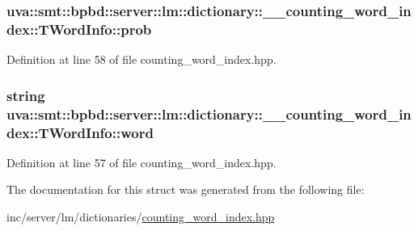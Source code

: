\subsubsection[{prob}]{ uva\+::smt\+::bpbd\+::server\+::lm\+::dictionary\+::\+\_\+\+\_\+counting\+\_\+word\+\_\+index\+::\+T\+Word\+Info\+::prob}\label{structuva_1_1smt_1_1bpbd_1_1server_1_1lm_1_1dictionary_1_1____counting__word__index_1_1_t_word_info_ad39acbec02b2bde9c70dd413eefced65}


Definition at line 58 of file counting\+\_\+word\+\_\+index.\+hpp.

\hypertarget{structuva_1_1smt_1_1bpbd_1_1server_1_1lm_1_1dictionary_1_1____counting__word__index_1_1_t_word_info_ade7f9a66782c83f4837c18021c621d38}{}
\subsubsection[{word}]{\setlength{\rightskip}{0pt plus 5cm}string uva\+::smt\+::bpbd\+::server\+::lm\+::dictionary\+::\+\_\+\+\_\+counting\+\_\+word\+\_\+index\+::\+T\+Word\+Info\+::word}\label{structuva_1_1smt_1_1bpbd_1_1server_1_1lm_1_1dictionary_1_1____counting__word__index_1_1_t_word_info_ade7f9a66782c83f4837c18021c621d38}


Definition at line 57 of file counting\+\_\+word\+\_\+index.\+hpp.



The documentation for this struct was generated from the following file\+:\begin{DoxyCompactItemize}
\item 
inc/server/lm/dictionaries/\hyperlink{counting__word__index_8hpp}{counting\+\_\+word\+\_\+index.\+hpp}\end{DoxyCompactItemize}

